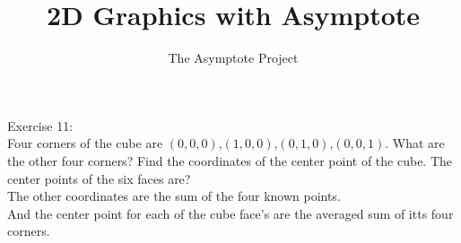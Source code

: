 \documentclass[12pt]{article}
\title{2D Graphics with Asymptote}
\author{The Asymptote Project}
\newcommand{\insertrep}[1]{%
	\hspace*{-2.4cm}
	\fbox{\texttt{[image: \#1]}}
}
\begin{document}
	Exercise 11:\\
	Four corners of the cube are $(0,0,0)$,$(1,0,0)$,$(0,1,0)$,$(0,0,1)$. What are the other four corners? Find the coordinates of the center point of the cube. The center points of the six faces are?\\
	The other coordinates are the sum of the four known points.\\
	And the center point for each of the cube face's are the averaged sum of itts four corners.
	\begin{center}
		\insertrep{exercise01011.pdf}
	\end{center}
\end{document}
